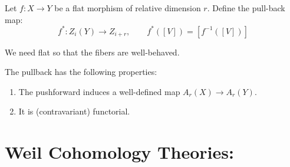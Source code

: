\documentclass[12pt]{amsart}
\begin{document}
\begin{definition} Let $f: X \to Y$ be a flat morphism of relative dimension $r$. Define the pull-back map:
    \[f^*: Z_i(Y) \to Z_{i+r}, \qquad f^*([V]) = [f^{-1}([V])]\]
\end{definition}
\begin{remark}
    We need flat so that the fibers are well-behaved. 
\end{remark}

\begin{theorem}
    The pullback has the following properties:
    \begin{enumerate}
        \item The pushforward induces a well-defined map $A_r(X) \to A_r(Y)$.
        \item It is (contravariant) functorial.
    \end{enumerate}
\end{theorem}

\newpage

\section{Weil Cohomology Theories:}

\end{document}
